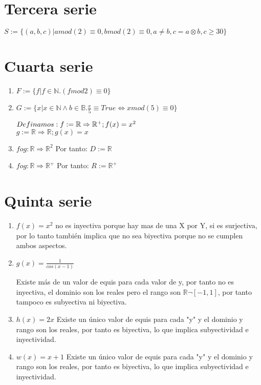 \documentclass{article}
\begin{document}
\section{Tercera serie}

\begin{center}
    $S:= \{(a,b,c)| amod(2) \equiv 0, bmod(2) \equiv 0, a \not= b, c = a \otimes b, c \geq 30 \}$
\end{center}

\section{Cuarta serie}

\begin{enumerate}
    \item $F:=\{ f|f\in \mathbb{N}. (fmod2)\equiv 0 \}$
    \item $G:= \{ x|x \in \mathbb{N} \wedge b \in \mathbb{B}.\frac{x}{5} \equiv True \Leftrightarrow xmod(5) \equiv 0 \}$
   \begin{center}
       $Definamos: \\
    f:= \mathbb{R} \Rightarrow \mathbb{R}^+; f(x) = x^2$\\
    $g:= \mathbb{R} \Rightarrow \mathbb{R};g(x) = x$
    \end{center}
    \item $fog: \mathbb{R} \Rightarrow \mathbb{R}^2$
   Por tanto: $D:=\mathbb{{R}}$
   \item $fog: \mathbb{R} \Rightarrow \mathbb{R}^+$
   Por tanto: $R:= \mathbb{R}^+$
\end{enumerate}
 


\section{Quinta serie}
\begin{enumerate}
    \item {$f(x)=x^2$}
no es inyectiva porque hay mas de una X por Y, si es surjectiva, por lo tanto también implica que no sea biyectiva porque no se cumplen ambos aspectos.
\item {$g(x)=\frac{1}{cos(x-1)}$}

Existe más de un valor de equis para cada valor de y, por tanto no es inyectiva, el dominio son los reales pero el rango son $\mathbb{R}\neg[-1,1]$, por tanto tampoco es subyectiva ni biyectiva.
\item{$h(x)=2x$}
Existe un único valor de equis para cada "y" y el dominio y rango son los reales, por tanto es biyectiva, lo que implica subyectividad e inyectividad.

\item{$w(x)=x+1$}
Existe un único valor de equis para cada "y" y el dominio y rango son los reales, por tanto es biyectiva, lo que implica subyectividad e inyectividad.
\end{enumerate}
\end{document}
